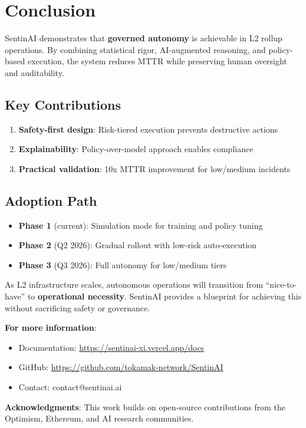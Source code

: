 \documentclass[11pt,a4paper]{article}
\begin{document}
\section{Conclusion}

SentinAI demonstrates that \textbf{governed autonomy} is achievable in L2 rollup operations. By combining statistical rigor, AI-augmented reasoning, and policy-based execution, the system reduces MTTR while preserving human oversight and auditability.

\subsection{Key Contributions}
\begin{enumerate}
    \item \textbf{Safety-first design}: Risk-tiered execution prevents destructive actions
    \item \textbf{Explainability}: Policy-over-model approach enables compliance
    \item \textbf{Practical validation}: 10x MTTR improvement for low/medium incidents
\end{enumerate}

\subsection{Adoption Path}
\begin{itemize}
    \item \textbf{Phase 1} (current): Simulation mode for training and policy tuning
    \item \textbf{Phase 2} (Q2 2026): Gradual rollout with low-risk auto-execution
    \item \textbf{Phase 3} (Q3 2026): Full autonomy for low/medium tiers
\end{itemize}

As L2 infrastructure scales, autonomous operations will transition from ``nice-to-have'' to \textbf{operational necessity}. SentinAI provides a blueprint for achieving this without sacrificing safety or governance.

\vspace{1em}
\noindent\textbf{For more information}:
\begin{itemize}
    \item Documentation: \url{https://sentinai-xi.vercel.app/docs}
    \item GitHub: \url{https://github.com/tokamak-network/SentinAI}
    \item Contact: contact@sentinai.ai
\end{itemize}

\vspace{1em}
\noindent\textbf{Acknowledgments}: This work builds on open-source contributions from the Optimism, Ethereum, and AI research communities.
\end{document}
